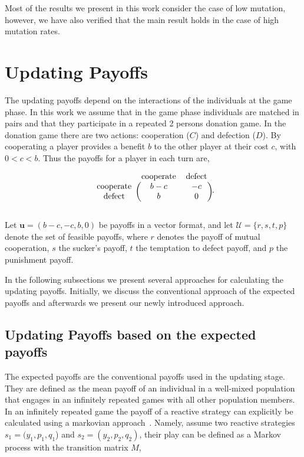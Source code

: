 \documentclass[11pt]{article}
\theoremstyle{plainCl1}
\theoremstyle{plainCl2}
\begin{document}
Most of the results we present in this work consider the case of low mutation,
however, we have also verified that the main result holds in the case of
high mutation rates. %

\section{Updating Payoffs}\label{section:updating_payoffs}

The updating payoffs depend on the interactions of the individuals at the game
phase. In this work we assume that in the game phase individuals are matched in
pairs and that they participate in a repeated 2 persons donation game. In the
donation game there are two actions: cooperation (\(C\)) and defection (\(D\)).
By cooperating a player provides a benefit \(b\) to the other player at their
cost \(c\), with \(0 < c < b\). Thus the payoffs for a player in each turn are,

\begin{equation}
    \begin{blockarray}{ccc}
        & \text{cooperate} & \text{defect} \\
        \begin{block}{c(cc)}
            \text{cooperate} & b - c & -c \\
            \text{defect} & b & 0 \\
        \end{block}
    \end{blockarray}.
\end{equation}

Let \(\mathbf{u} = (b-c, -c, b, 0)\) be payoffs in a vector format, and let \(\mathcal{U}
= \{r, s, t, p\}\) denote the set of feasible payoffs, where \(r\) denotes the
payoff of mutual cooperation, \(s\) the sucker's payoff, \(t\) the temptation to
defect payoff, and \(p\) the punishment payoff.

In the following subsections we present several approaches for calculating
the updating payoffs. Initially, we discuss the conventional approach of the
expected payoffs and afterwards we present our newly introduced approach.

\subsection{Updating Payoffs based on the expected payoffs}

The expected payoffs are the conventional payoffs used in the updating stage.
They are defined as the mean payoff of an individual in a well-mixed population
that engages in an infinitely repeated games with all other population members. In
an infinitely repeated game the payoff of a reactive strategy can explicitly be
calculated using a markovian approach~\cite{}. Namely, assume two reactive
strategies $s_1\!=\!(y_1, p_1, q_1$) and $s_2\!=\!(y_2,p_2,q_2)$, their play can
be defined as a Markov process with the transition matrix \(M\),
\end{document}
